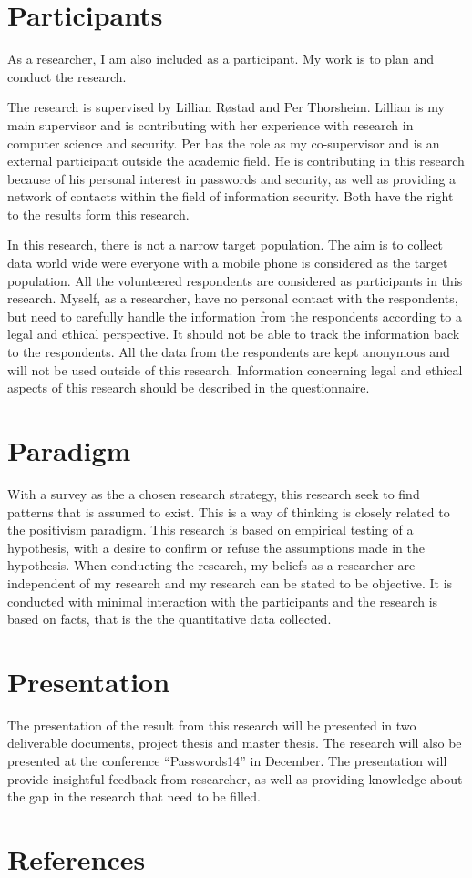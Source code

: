   \section*{Participants}

  As a researcher, I am also included as a participant. My work is to plan and conduct the research. 

  The research is supervised by Lillian Røstad and Per Thorsheim. Lillian is my main supervisor and is contributing with her experience with research in computer science and security. Per has the role as my co-supervisor and is an external participant outside the academic field. He is contributing in this research because of his personal interest in passwords and security, as well as providing a network of contacts within the field of information security. Both have the right to the results form this research.

  In this research, there is not a narrow target population. The aim is to collect data world wide were everyone with a mobile phone is considered as the target population. All the volunteered respondents are considered as participants in this research. Myself, as a researcher, have no personal contact with the respondents, but need to carefully handle the information from the respondents according to a legal and ethical perspective. It should not be able to track the information back to the respondents. All the data from the respondents are kept anonymous and will not be used outside of this research. Information concerning legal and ethical aspects of this research should be described in the questionnaire. 

  \section*{Paradigm}
  With a survey as the a chosen research strategy, this research seek to find patterns that is assumed to exist. This is a way of thinking is closely related to the positivism paradigm. This research is based on empirical testing of a hypothesis, with a desire to confirm or refuse the assumptions made in the hypothesis.
  When conducting the research, my beliefs as a researcher are independent of my research and my research can be stated to be objective. It is conducted with minimal interaction with the participants and the research is based on facts, that is the the quantitative data collected. 

  \section*{Presentation}
  The presentation of the result from this research will be presented in two deliverable documents, project thesis and master thesis. The research will also be presented at the conference ``Passwords14''\cite{passwords} in December. The presentation will provide insightful feedback from researcher, as well as providing knowledge about the gap in the research that need to be filled. 



  \section*{References}
  \renewcommand{\bibsection}{ }
  
  







  